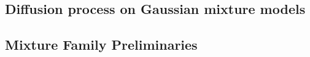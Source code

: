 \documentclass[11pt]{article}
\newcommand{\vect}[1]{\mathbf{#1}}
\theoremstyle{plain}
\newcommand{\1}{\mathbbm{1}}
\newcommand{\qdist}[2][]{q_{#1}^{(#2)}}
\newcommand{\score}[2][]{\vect{s}_{#1}^{(#2)}}
\begin{document}
\begin{appendices}

\section{Diffusion process on Gaussian mixture models}
\subsection{Mixture Family Preliminaries}


\end{appendices}
\end{document}
